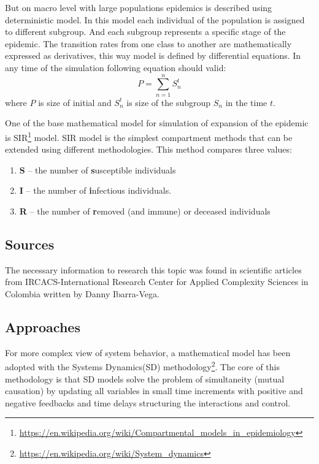 \documentclass[12pt,a4paper,english]{article}
\begin{document}
    But on macro level with large populations epidemics is described using deterministic model.
    In this model each individual of the population is assigned to different subgroup.
    And each subgroup represents a specific stage of the epidemic.
    The transition rates from one class to another are mathematically expressed as derivatives, this way model is defined by differential equations.
    In any time of the simulation following equation should valid:
    \begin{equation}
        \label{primary_question}
        P = \sum_{n = 1}^{n} S^t_n
      \end{equation}
    where $P$ is size of initial and $S^t_n$ is size of the subgroup $S_n$ in the time $t$. 

    One of the base mathematical model for simulation of expansion of the epidemic is SIR\footnote{\href{https://en.wikipedia.org/wiki/Compartmental\_models\_in\_epidemiology}{https://en.wikipedia.org/wiki/Compartmental\_models\_in\_epidemiology}} model. 
    SIR model is the simplest compartment methods that can be extended using different methodologies.
    This method compares three values:
    \begin{enumerate}
        \item \textbf{S} -- the number of \textbf{s}usceptible individuals
        \item \textbf{I} -- the number of \textbf{i}nfectious individuals.
        \item \textbf{R} -- the number of \textbf{r}emoved (and immune) or deceased individuals
    \end{enumerate} 

    \subsection{Sources}
    The necessary information to research this topic was found in scientific articles from IRCACS-International Research Center for Applied Complexity Sciences in  Colombia written by Danny Ibarra-Vega\cite{math_article}.

    \subsection{Approaches}
    For more complex view of system behavior, a mathematical model has been adopted with the Systems Dynamics(SD) methodology\footnote{\href{https://en.wikipedia.org/wiki/System\_dynamics}{https://en.wikipedia.org/wiki/System\_dynamics}}.
    The core of this methodology is that SD models solve the problem of simultaneity (mutual causation) by updating all variables in small time increments with positive and negative feedbacks and time delays structuring the interactions and control.
    
\end{document}
